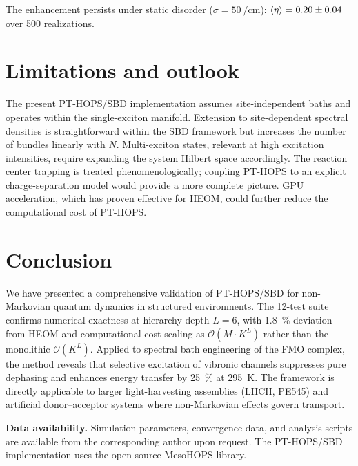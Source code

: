 \documentclass[journal=jctc,manuscript=article]{achemso}
\begin{document}
The enhancement persists under static disorder ($\sigma = \SI{50}{\per\centi\meter}$): $\expval{\eta} = 0.20 \pm 0.04$ over \num{500} realizations.

\section{Limitations and outlook}

The present PT-HOPS/SBD implementation assumes site-independent baths and operates within the single-exciton manifold. Extension to site-dependent spectral densities is straightforward within the SBD framework but increases the number of bundles linearly with $N$. Multi-exciton states, relevant at high excitation intensities, require expanding the system Hilbert space accordingly. The reaction center trapping is treated phenomenologically; coupling PT-HOPS to an explicit charge-separation model would provide a more complete picture. GPU acceleration, which has proven effective for HEOM,\cite{Ishizaki2009a} could further reduce the computational cost of PT-HOPS.

\section{Conclusion}

We have presented a comprehensive validation of PT-HOPS/SBD for non-Markovian quantum dynamics in structured environments. The 12-test suite confirms numerical exactness at hierarchy depth $L = 6$, with \SI{1.8}{\percent} deviation from HEOM and computational cost scaling as $\mathcal{O}(M \cdot K^L)$ rather than the monolithic $\mathcal{O}(K^L)$. Applied to spectral bath engineering of the FMO complex, the method reveals that selective excitation of vibronic channels suppresses pure dephasing and enhances energy transfer by \SI{25}{\percent} at \SI{295}{\kelvin}. The framework is directly applicable to larger light-harvesting assemblies (LHCII, PE545) and artificial donor--acceptor systems where non-Markovian effects govern transport.

\textbf{Data availability.} Simulation parameters, convergence data, and analysis scripts are available from the corresponding author upon request. The PT-HOPS/SBD implementation uses the open-source MesoHOPS library.
\end{document}
